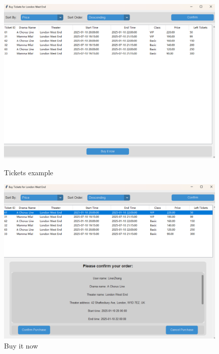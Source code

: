 \documentclass[12pt]{article}
\begin{document}
\begin{figure}[H]
    \centering
    \begin{minipage}{0.48\textwidth}
        \centering
        \includegraphics[width=\textwidth]{21.png}
        \caption{Tickets example} 
        \label{Figure 21}
    \end{minipage}
    \hfill
    \begin{minipage}{0.48\textwidth}
        \centering
        \includegraphics[width=\textwidth]{22.png}
        \caption{Buy it now}
        \label{Figure 22}
    \end{minipage}
\end{figure}
\end{document}
